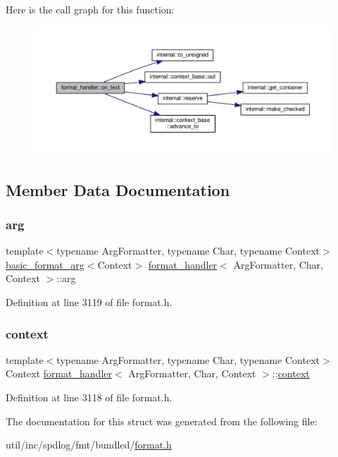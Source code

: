 Here is the call graph for this function\+:
\nopagebreak
\begin{figure}[H]
\begin{center}
\leavevmode
\includegraphics[width=350pt]{structformat__handler_a0658a1b87089088fae4267f567e9ee7d_cgraph}
\end{center}
\end{figure}


\subsection{Member Data Documentation}
\mbox{\label{structformat__handler_a36cf5020da11b151d4ba46b0354a6356}} 
\subsubsection{\texorpdfstring{arg}{arg}}
{\footnotesize\ttfamily template$<$typename Arg\+Formatter, typename Char, typename Context$>$ \\
\hyperlink{classbasic__format__arg}{basic\+\_\+format\+\_\+arg}$<$Context$>$ \hyperlink{structformat__handler}{format\+\_\+handler}$<$ Arg\+Formatter, Char, Context $>$\+::arg}



Definition at line 3119 of file format.\+h.

\mbox{\label{structformat__handler_ac4b040908991e61745acef69487df339}} 
\subsubsection{\texorpdfstring{context}{context}}
{\footnotesize\ttfamily template$<$typename Arg\+Formatter, typename Char, typename Context$>$ \\
Context \hyperlink{structformat__handler}{format\+\_\+handler}$<$ Arg\+Formatter, Char, Context $>$\+::\hyperlink{format_8h_af1dcf0d1d6738a06a6d7fd63e0bd1859}{context}}



Definition at line 3118 of file format.\+h.



The documentation for this struct was generated from the following file\+:\begin{DoxyCompactItemize}
\item 
util/inc/spdlog/fmt/bundled/\hyperlink{format_8h}{format.\+h}\end{DoxyCompactItemize}
